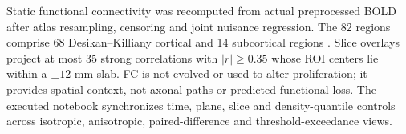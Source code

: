 Static functional connectivity was recomputed from actual preprocessed BOLD after atlas resampling, censoring and joint nuisance regression. The 82 regions comprise 68 Desikan--Killiany cortical and 14 subcortical regions \citep{desikan2006}. Slice overlays project at most 35 strong correlations with $|r|\geq0.35$ whose ROI centers lie within a $\pm12$ mm slab. FC is not evolved or used to alter proliferation; it provides spatial context, not axonal paths or predicted functional loss. The executed notebook synchronizes time, plane, slice and density-quantile controls across isotropic, anisotropic, paired-difference and threshold-exceedance views.
